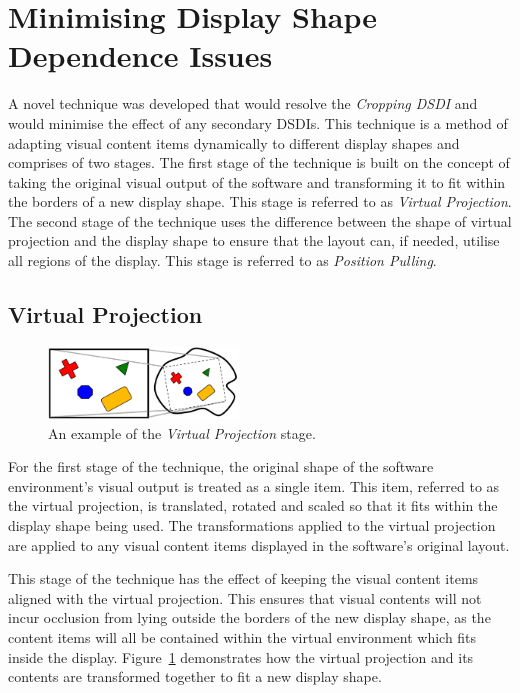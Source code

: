 \documentclass[twocolumn,compsoc]{cvm}
\begin{document}
\section{Minimising Display Shape Dependence Issues}
\label{sec:solution}

A novel technique was developed that would resolve the {\emph{Cropping \ac{DSDI}}} and would minimise the effect of any secondary \acp{DSDI}.
This technique is a method of adapting visual content items dynamically to different display shapes and comprises of two stages.
The first stage of the technique is built on the concept of taking the original visual output of the software and transforming it to fit within the borders of a new display shape.
This stage is referred to as {\em Virtual Projection}.
The second stage of the technique uses the difference between the shape of virtual projection and the display shape to ensure that the layout can, if needed, utilise all regions of the display.
This stage is referred to as {\em Position Pulling}.

\subsection{Virtual Projection}
\label{subsec:virtualprojection}

\begin{figure}[h!]
 \centering
   \includegraphics[width=0.45\textwidth]{figures/VirtualProjection.jpeg}
   \caption{An example of the {\emph{Virtual Projection}} stage.}
   \label{fig:virtualRectangle}
\end{figure}

For the first stage of the technique, the original shape of the software environment's visual output is treated as a single item.
This item, referred to as the virtual projection, is translated, rotated and scaled so that it fits within the display shape being used.
The transformations applied to the virtual projection are applied to any visual content items displayed in the software's original layout.

This stage of the technique has the effect of keeping the visual content items aligned with the virtual projection.
This ensures that visual contents will not incur occlusion from lying outside the borders of the new display shape, as the content items will all be contained within the virtual environment which fits inside the display.
Figure~\ref{fig:virtualRectangle} demonstrates how the virtual projection and its contents are transformed together to fit a new display shape.
\end{document}
